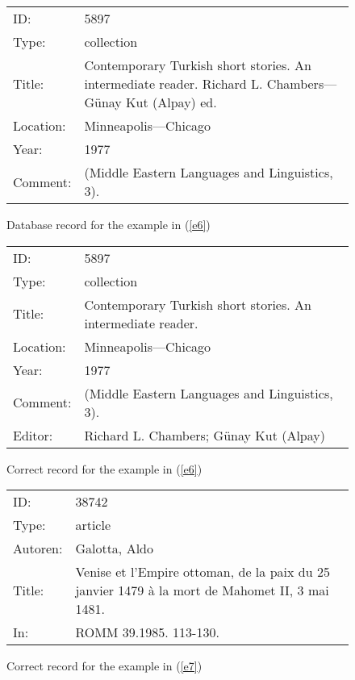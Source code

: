 \documentclass{scrartcl}
\begin{document}
\begin{figure}[ht]
\begin{tabular}{|p{}p{}|}
ID:&  	5897\\
Type:& 	collection \\
Title:& 	Contemporary Turkish short stories. An intermediate reader. Richard L.
Chambers—Günay Kut (Alpay) ed. \\
Location:& 	Minneapolis—Chicago \\
Year:& 	1977 \\
Comment:& 	(Middle Eastern Languages and Linguistics, 3).
\end{tabular}
\caption{Database record for the example in (\ref{e6}) \label{e6:f1}}
\end{figure} 

\begin{figure}[ht]
\begin{tabular}{|p{}p{}|}
ID:&  	5897\\
Type:& 	collection \\
Title:& 	Contemporary Turkish short stories. An intermediate reader.  \\
Location:& 	Minneapolis—Chicago \\
Year:& 	1977 \\
Comment:& 	(Middle Eastern Languages and Linguistics, 3).\\
Editor:& Richard L. Chambers; Günay Kut (Alpay)
\end{tabular}
\caption{Correct record for the example in (\ref{e6}) \label{e6:f2}}
\end{figure}

\begin{figure}[ht]
\begin{tabular}{|p{}p{}|}
ID:  	&38742 \\
Type: 	&article \\
Autoren: &Galotta, Aldo \\ 	
Title: 	&Venise et l'Empire ottoman, de la paix du 25 janvier 1479 à la mort de
Mahomet II, 3 mai 1481. \\
In: 	&ROMM 39.1985. 113-130.
\end{tabular}
\caption{Correct record for the example in (\ref{e7}) \label{e7:f2}}
\end{figure}
\end{document}
